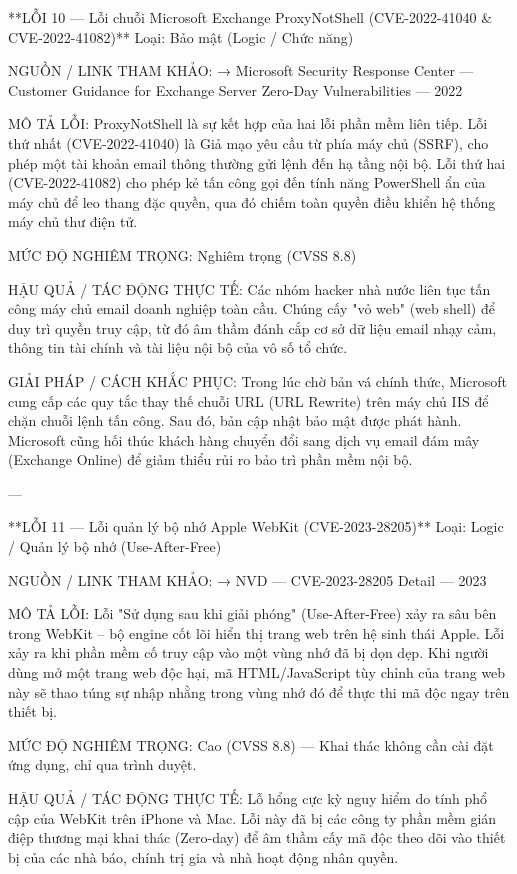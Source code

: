 **LỖI 10 — Lỗi chuỗi Microsoft Exchange ProxyNotShell (CVE-2022-41040 \& CVE-2022-41082)**
Loại: Bảo mật (Logic / Chức năng)

NGUỒN / LINK THAM KHẢO:
→ Microsoft Security Response Center — Customer Guidance for Exchange Server Zero-Day Vulnerabilities — 2022

MÔ TẢ LỖI:
ProxyNotShell là sự kết hợp của hai lỗi phần mềm liên tiếp. Lỗi thứ nhất (CVE-2022-41040) là Giả mạo yêu cầu từ phía máy chủ (SSRF), cho phép một tài khoản email thông thường gửi lệnh đến hạ tầng nội bộ. Lỗi thứ hai (CVE-2022-41082) cho phép kẻ tấn công gọi đến tính năng PowerShell ẩn của máy chủ để leo thang đặc quyền, qua đó chiếm toàn quyền điều khiển hệ thống máy chủ thư điện tử.

MỨC ĐỘ NGHIÊM TRỌNG:
Nghiêm trọng (CVSS 8.8)

HẬU QUẢ / TÁC ĐỘNG THỰC TẾ:
Các nhóm hacker nhà nước liên tục tấn công máy chủ email doanh nghiệp toàn cầu. Chúng cấy "vỏ web" (web shell) để duy trì quyền truy cập, từ đó âm thầm đánh cắp cơ sở dữ liệu email nhạy cảm, thông tin tài chính và tài liệu nội bộ của vô số tổ chức.

GIẢI PHÁP / CÁCH KHẮC PHỤC:
Trong lúc chờ bản vá chính thức, Microsoft cung cấp các quy tắc thay thế chuỗi URL (URL Rewrite) trên máy chủ IIS để chặn chuỗi lệnh tấn công. Sau đó, bản cập nhật bảo mật được phát hành. Microsoft cũng hối thúc khách hàng chuyển đổi sang dịch vụ email đám mây (Exchange Online) để giảm thiểu rủi ro bảo trì phần mềm nội bộ.

---

**LỖI 11 — Lỗi quản lý bộ nhớ Apple WebKit (CVE-2023-28205)**
Loại: Logic / Quản lý bộ nhớ (Use-After-Free)

NGUỒN / LINK THAM KHẢO:
→ NVD — CVE-2023-28205 Detail — 2023

MÔ TẢ LỖI:
Lỗi "Sử dụng sau khi giải phóng" (Use-After-Free) xảy ra sâu bên trong WebKit – bộ engine cốt lõi hiển thị trang web trên hệ sinh thái Apple. Lỗi xảy ra khi phần mềm cố truy cập vào một vùng nhớ đã bị dọn dẹp. Khi người dùng mở một trang web độc hại, mã HTML/JavaScript tùy chỉnh của trang web này sẽ thao túng sự nhập nhằng trong vùng nhớ đó để thực thi mã độc ngay trên thiết bị.

MỨC ĐỘ NGHIÊM TRỌNG:
Cao (CVSS 8.8) — Khai thác không cần cài đặt ứng dụng, chỉ qua trình duyệt.

HẬU QUẢ / TÁC ĐỘNG THỰC TẾ:
Lỗ hổng cực kỳ nguy hiểm do tính phổ cập của WebKit trên iPhone và Mac. Lỗi này đã bị các công ty phần mềm gián điệp thương mại khai thác (Zero-day) để âm thầm cấy mã độc theo dõi vào thiết bị của các nhà báo, chính trị gia và nhà hoạt động nhân quyền.

